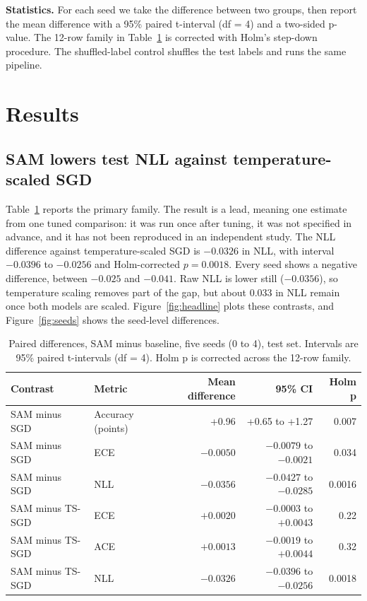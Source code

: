 \documentclass[11pt,letterpaper]{article}
\begin{document}
\textbf{Statistics.} For each seed we take the difference between two groups, then report the mean difference with a 95\% paired t-interval (df = 4) and a two-sided p-value. The 12-row family in Table~\ref{tab:main} is corrected with Holm's step-down procedure. The shuffled-label control shuffles the test labels and runs the same pipeline.

\section{Results}\label{sec:results}
\subsection{SAM lowers test NLL against temperature-scaled SGD}\label{sec:nll}
Table~\ref{tab:main} reports the primary family. The result is a lead, meaning one estimate from one tuned comparison: it was run once after tuning, it was not specified in advance, and it has not been reproduced in an independent study. The NLL difference against temperature-scaled SGD is $-0.0326$ in NLL, with interval $-0.0396$ to $-0.0256$ and Holm-corrected $p = 0.0018$. Every seed shows a negative difference, between $-0.025$ and $-0.041$. Raw NLL is lower still ($-0.0356$), so temperature scaling removes part of the gap, but about 0.033 in NLL remain once both models are scaled. Figure~\ref{fig:headline} plots these contrasts, and Figure~\ref{fig:seeds} shows the seed-level differences.

\begin{table}[!htbp]
  \centering
  \caption{Paired differences, SAM minus baseline, five seeds (0 to 4), test set. Intervals are 95\% paired t-intervals (df = 4). Holm p is corrected across the 12-row family.}
  \label{tab:main}
  \begin{tabular}{llrrr}
    \toprule
    Contrast & Metric & Mean difference & 95\% CI & Holm p \\
    \midrule
    SAM minus SGD & Accuracy (points) & +0.96 & +0.65 to +1.27 & 0.007 \\
    SAM minus SGD & ECE & $-0.0050$ & $-0.0079$ to $-0.0021$ & 0.034 \\
    SAM minus SGD & NLL & $-0.0356$ & $-0.0427$ to $-0.0285$ & 0.0016 \\
    SAM minus TS-SGD & ECE & $+0.0020$ & $-0.0003$ to $+0.0043$ & 0.22 \\
    SAM minus TS-SGD & ACE & $+0.0013$ & $-0.0019$ to $+0.0044$ & 0.32 \\
    SAM minus TS-SGD & NLL & $-0.0326$ & $-0.0396$ to $-0.0256$ & 0.0018 \\
    \bottomrule
  \end{tabular}
\end{table}
\end{document}

